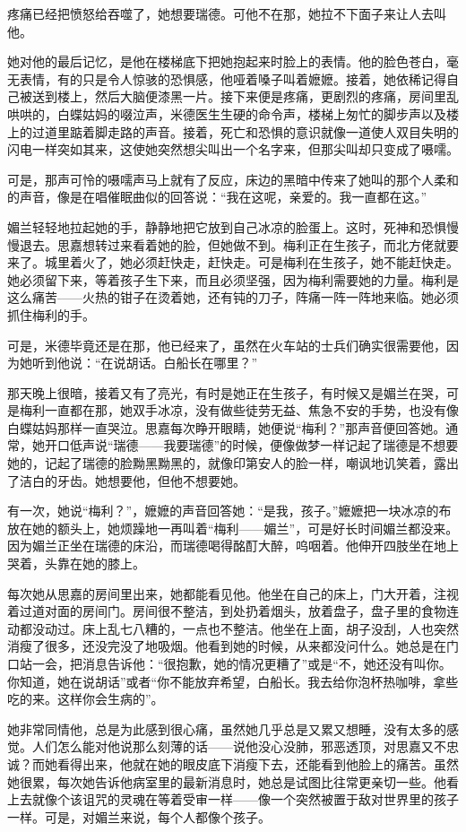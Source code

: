 \par 疼痛已经把愤怒给吞噬了，她想要瑞德。可他不在那，她拉不下面子来让人去叫他。
\par 她对他的最后记忆，是他在楼梯底下把她抱起来时脸上的表情。他的脸色苍白，毫无表情，有的只是令人惊骇的恐惧感，他哑着嗓子叫着嬷嬷。接着，她依稀记得自己被送到楼上，然后大脑便漆黑一片。接下来便是疼痛，更剧烈的疼痛，房间里乱哄哄的，白蝶姑妈的啜泣声，米德医生生硬的命令声，楼梯上匆忙的脚步声以及楼上的过道里踮着脚走路的声音。接着，死亡和恐惧的意识就像一道使人双目失明的闪电一样突如其来，这使她突然想尖叫出一个名字来，但那尖叫却只变成了嗫嚅。
\par 可是，那声可怜的嗫嚅声马上就有了反应，床边的黑暗中传来了她叫的那个人柔和的声音，像是在唱催眠曲似的回答说：“我在这呢，亲爱的。我一直都在这。”
\par 媚兰轻轻地拉起她的手，静静地把它放到自己冰凉的脸蛋上。这时，死神和恐惧慢慢退去。思嘉想转过来看着她的脸，但她做不到。梅利正在生孩子，而北方佬就要来了。城里着火了，她必须赶快走，赶快走。可是梅利在生孩子，她不能赶快走。她必须留下来，等着孩子生下来，而且必须坚强，因为梅利需要她的力量。梅利是这么痛苦——火热的钳子在烫着她，还有钝的刀子，阵痛一阵一阵地来临。她必须抓住梅利的手。
\par 可是，米德毕竟还是在那，他已经来了，虽然在火车站的士兵们确实很需要他，因为她听到他说：“在说胡话。白船长在哪里？”
\par 那天晚上很暗，接着又有了亮光，有时是她正在生孩子，有时候又是媚兰在哭，可是梅利一直都在那，她双手冰凉，没有做些徒劳无益、焦急不安的手势，也没有像白蝶姑妈那样一直哭泣。思嘉每次睁开眼睛，她便说“梅利？”那声音便回答她。通常，她开口低声说“瑞德——我要瑞德”的时候，便像做梦一样记起了瑞德是不想要她的，记起了瑞德的脸黝黑黝黑的，就像印第安人的脸一样，嘲讽地讥笑着，露出了洁白的牙齿。她想要他，但他不想要她。
\par 有一次，她说“梅利？”，嬷嬷的声音回答她：“是我，孩子。”嬷嬷把一块冰凉的布放在她的额头上，她烦躁地一再叫着“梅利——媚兰”，可是好长时间媚兰都没来。因为媚兰正坐在瑞德的床沿，而瑞德喝得酩酊大醉，呜咽着。他伸开四肢坐在地上哭着，头靠在她的膝上。
\par 每次她从思嘉的房间里出来，她都能看见他。他坐在自己的床上，门大开着，注视着过道对面的房间门。房间很不整洁，到处扔着烟头，放着盘子，盘子里的食物连动都没动过。床上乱七八糟的，一点也不整洁。他坐在上面，胡子没刮，人也突然消瘦了很多，还没完没了地吸烟。他看到她的时候，从来都没问什么。她总是在门口站一会，把消息告诉他：“很抱歉，她的情况更糟了”或是“不，她还没有叫你。你知道，她在说胡话”或者“你不能放弃希望，白船长。我去给你泡杯热咖啡，拿些吃的来。这样你会生病的”。
\par 她非常同情他，总是为此感到很心痛，虽然她几乎总是又累又想睡，没有太多的感觉。人们怎么能对他说那么刻薄的话——说他没心没肺，邪恶透顶，对思嘉又不忠诚？而她看得出来，他就在她的眼皮底下消瘦下去，还能看到他脸上的痛苦。虽然她很累，每次她告诉他病室里的最新消息时，她总是试图比往常更亲切一些。他看上去就像个该诅咒的灵魂在等着受审一样——像一个突然被置于敌对世界里的孩子一样。可是，对媚兰来说，每个人都像个孩子。

